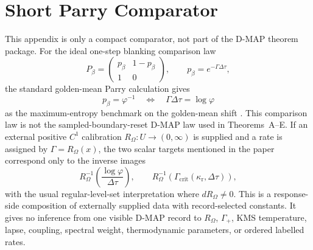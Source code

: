 \section{Short Parry Comparator}\label{sec:kms-shells}

\begin{remark}
\label{def:thermality-notions-main}
\label{prop:ideal-main}
\label{cor:conditional-calibration-bridge-main}
\label{thm:response-locus-main}
\label{ass:udw-rate-calibration-main}
This appendix is only a compact comparator, not part of the D-MAP theorem
package.  For the ideal one-step blanking comparison law
\[
P_\beta=
\begin{pmatrix}
p_\beta&1-p_\beta\\
1&0
\end{pmatrix},
\qquad p_\beta=e^{-\Gamma\Delta\tau},
\]
the standard golden-mean Parry calculation gives
\[
p_\beta=\varphi^{-1}
\quad\Longleftrightarrow\quad
\Gamma\Delta\tau=\log\varphi
\]
as the maximum-entropy benchmark on the golden-mean shift
\cite{Parry1964,LindMarcus1995}.  This comparison law is not the
sampled-boundary-reset D-MAP law used in Theorems~A--E.  If an external
positive \(C^1\) calibration \(R_\Omega:U\to(0,\infty)\) is supplied and a
rate is assigned by \(\Gamma=R_\Omega(x)\), the two scalar targets mentioned
in the paper correspond only to the inverse images
\[
R_\Omega^{-1}\!\left(\frac{\log\varphi}{\Delta\tau}\right),
\qquad
R_\Omega^{-1}\!\left(\Gamma_{\mathrm{crit}}
(\kappa_{\mathrm r},\Delta\tau)\right),
\]
with the usual regular-level-set interpretation where \(dR_\Omega\ne0\).
This is a response-side composition of externally supplied data with
record-selected constants.  It gives no inference from one visible D-MAP
record to \(R_\Omega\), \(\Gamma_+\), KMS temperature, lapse, coupling,
spectral weight, thermodynamic parameters, or ordered labelled rates.
\end{remark}
